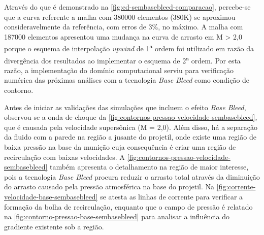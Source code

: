 Através do que é demonstrado na \autoref{fig:cd-sembasebleed-comparacao}, percebe-se que a curva referente a malha com \num{380000} elementos (380K) se aproximou consideravelmente da referência, com erros de 3\%, no máximo. A malha com \num{187000} elementos apresentou uma mudança na curva de arrasto em M > 2,0 porque o esquema de interpolação \textit{upwind} de 1\textsuperscript{a} ordem foi utilizado em razão da divergência dos resultados ao implementar o esquema de 2\textsuperscript{a} ordem. Por esta razão, a implementação do domínio computacional serviu para verificação numérica das próximas análises com a tecnologia \textit{Base Bleed} como condição de contorno.

Antes de iniciar as validações das simulações que incluem o efeito \textit{Base Bleed}, observou-se a onda de choque da \autoref{fig:contornos-pressao-velocidade-sembasebleed}, que é causada pela velocidade supersônica (M = 2,0). Além disso, há a separação da fluido com a parede na região a jusante do projetil, onde existe uma região de baixa pressão na base da munição cuja consequência é criar uma região de recirculação com baixas velocidades. A \autoref{fig:contornos-pressao-velocidade-sembasebleed} também apresenta o detalhamento na região de maior interesse, pois a tecnologia \textit{Base Bleed} procura reduzir o arrasto total através da diminuição do arrasto causado pela pressão atmosférica na base do projetil. Na \autoref{fig:corrente-velocidade-base-sembasebleed} se atesta as linhas de corrente para verificar a formação da bolha de recirculação, enquanto que o campo de pressão é relatado na \autoref{fig:contorno-pressao-base-sembasebleed} para analisar a influência do gradiente existente sob a região.

